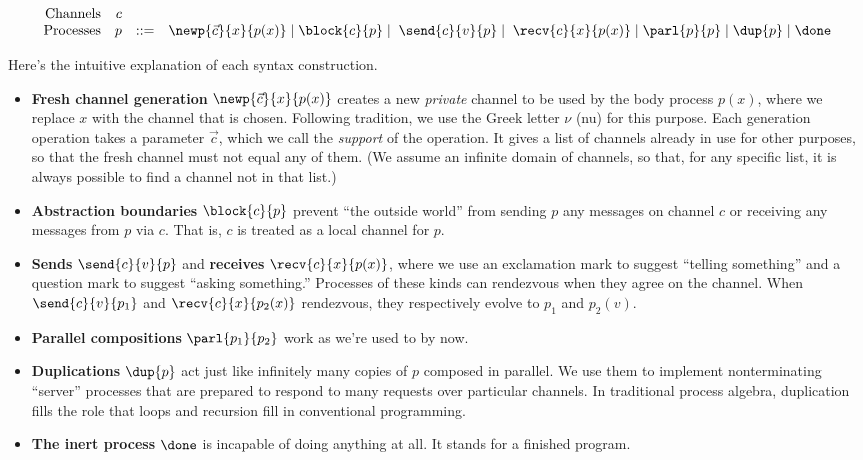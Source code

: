 \documentclass{amsbook}
\theoremstyle{definition}
\theoremstyle{remark}
\numberwithin{section}{chapter}
\numberwithin{equation}{chapter}
\begin{document}
$$\begin{array}{rrcl}
  \textrm{Channels} & c \\
  \textrm{Processes} & p &::=& \newp{\vec{c}}{x}{p(x)} \mid \block{c}{p} \mid \; \send{c}{v}{p} \mid \; \recv{c}{x}{p(x)} \mid \parl{p}{p} \mid \dup{p} \mid \done
\end{array}$$

Here's the intuitive explanation of each syntax construction.
\begin{itemize}
  \item \textbf{Fresh channel generation} $\newp{\vec{c}}{x}{p(x)}$ creates a new \emph{private} channel to be used by the body process $p(x)$, where we replace $x$ with the channel that is chosen.  Following tradition, we use the Greek letter $\nu$\index{$\nu$} (nu) for this purpose.  Each generation operation takes a parameter $\vec{c}$, which we call the \emph{support} of the operation.  It gives a list of channels already in use for other purposes, so that the fresh channel must not equal any of them.  (We assume an infinite domain of channels, so that, for any specific list, it is always possible to find a channel not in that list.)

  \item \textbf{Abstraction boundaries} $\block{c}{p}$ prevent ``the outside world'' from sending $p$ any messages on channel $c$ or receiving any messages from $p$ via $c$.  That is, $c$ is treated as a local channel for $p$.
\abstraction

  \item \textbf{Sends} $\send{c}{v}{p}$ and \textbf{receives} $\recv{c}{x}{p(x)}$, where we use an exclamation mark to suggest ``telling something'' and a question mark to suggest ``asking something.''  Processes of these kinds can rendezvous when they agree on the channel.  When $\send{c}{v}{p_1}$ and $\recv{c}{x}{p_2(x)}$ rendezvous, they respectively evolve to $p_1$ and $p_2(v)$.

  \item \textbf{Parallel compositions} $\parl{p_1}{p_2}$ work as we're used to by now.

  \item \textbf{Duplications} $\dup{p}$ act just like infinitely many copies of $p$ composed in parallel.  We use them to implement nonterminating ``server'' processes that are prepared to respond to many requests over particular channels.  In traditional process algebra, duplication fills the role that loops and recursion fill in conventional programming.

  \item \textbf{The inert process} $\done$ is incapable of doing anything at all.  It stands for a finished program.
\end{itemize}
\end{document}
